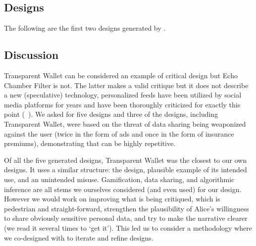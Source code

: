 \subsection{Designs}

The following are the first two designs generated by \gpt.



\subsection{Discussion}

Transparent Wallet can be considered an example of critical design but Echo Chamber Filter is not. The latter makes a valid critique but it does not describe a new (speculative) technology, personalized feeds have been utilized by social media platforms for years and have been thoroughly criticized for exactly this point (\eg~\cite{snakeoil}). We asked for five designs and three of the designs, including Transparent Wallet, were based on the threat of data sharing being weaponized against the user (twice in the form of ads and once in the form of insurance premiums), demonstrating that \gpt can be highly repetitive. 

Of all the five generated designs, Transparent Wallet was the closest to our own designs. It uses a similar structure: the design, plausible example of its intended use, and an unintended misuse. Gamification, data sharing, and algorithmic inference are all stems we ourselves considered (and even used) for our design. However we would work on improving what is being critiqued, which is pedestrian and straight-forward, strengthen the plausibility of Alice's willingness to share obviously sensitive personal data, and try to make the narrative clearer (we read it several times to `get it'). This led us to consider a methodology where we co-designed with \gpt to iterate and refine designs.


